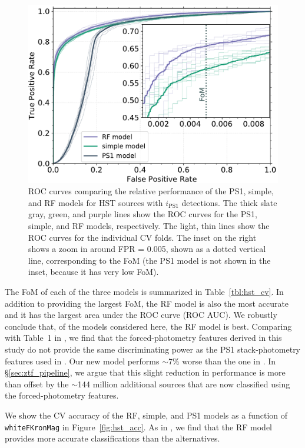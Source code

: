 \documentclass[twocolumn]{aastex63}
\begin{document}
\begin{figure}[t]
 \centering
  \includegraphics[width=\columnwidth]{./figures/CV_ROC_FHST.pdf}
  \caption{ ROC curves comparing the relative performance of the PS1, simple,
  and RF models for HST sources with $i_\mathrm{PS1}$ detections. The thick
  slate gray, green, and purple lines show the ROC curves for the PS1, simple,
  and RF models, respectively. The light, thin lines show the ROC curves for
  the individual CV folds. The inset on the right shows a zoom in around FPR =
  0.005, shown as a dotted vertical line, corresponding to the FoM (the PS1
  model is not shown in the inset, because it has very low FoM).}
  \label{fig:hst_roc}
\end{figure}

The FoM of each of the three models is summarized in Table~\ref{tbl:hst_cv}.
In addition to providing the largest FoM, the RF model is also the most
accurate and it has the largest area under the ROC curve (ROC AUC). We
robustly conclude that, of the models considered here, the RF model is best.
Comparing with Table~1 in \citet{Tachibana18}, we find that the
forced-photometry features derived in this study do not provide the same
discriminating power as the PS1 stack-photometry features used in
\citet{Tachibana18}. Our new model performs $\sim$7\% worse than the one in
\citet{Tachibana18}. In \S\ref{sec:ztf_pipeline}, we argue that this slight
reduction in performance is more than offset by the $\sim$144 million
additional sources that are now classified using the forced-photometry
features.



We show the CV accuracy of the RF, simple, and PS1 models as a function of
\texttt{whiteFKronMag} in Figure~\ref{fig:hst_acc}. As in \citet{Tachibana18},
we find that the RF model provides more accurate classifications than the
alternatives.
\end{document}
